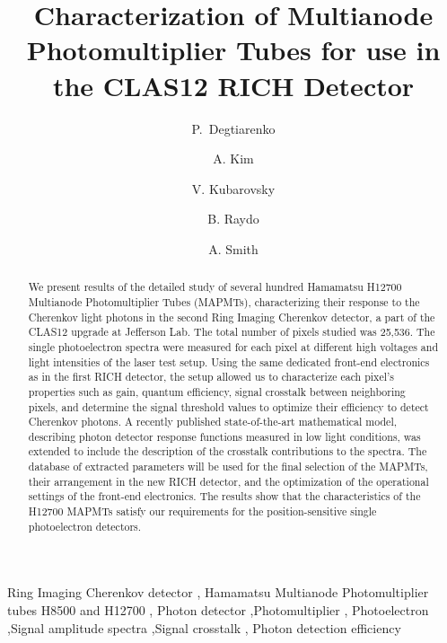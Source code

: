 \documentclass[5p,times,preprint]{elsarticle}
\begin{document}
\begin{frontmatter}
\title{Characterization of Multianode Photomultiplier Tubes for use in the CLAS12 RICH Detector}

\author[A]{P.~Degtiarenko }
\author[B]{A. Kim } 
\author[A]{V. Kubarovsky }
\author[A]{B. Raydo}
\author[C]{A. Smith}



\address[A]{Thomas Je erson National Accelerator Facility, Newport News, VA 23606, USA}
\address[B]{University of Connecticut, Storrs, CT 06269, USA}
\address[C]{Duke University, Durham, NC 27705, USA}



\begin{abstract}
We present results of the detailed study of several hundred Hamamatsu H12700 Multianode Photomultiplier Tubes (MAPMTs), characterizing their response to the Cherenkov light photons in the second Ring Imaging Cherenkov detector, a part of the CLAS12 upgrade at Jefferson Lab.
The total number of pixels studied was 25,536.
The single photoelectron spectra were measured for each pixel at different high voltages and  light intensities of the laser test setup. Using the same dedicated front-end electronics as in the first RICH detector, the setup allowed us to characterize each pixel's properties such as gain, quantum efficiency, signal crosstalk between neighboring pixels,
and determine the signal threshold values to optimize their efficiency to detect Cherenkov photons.
A recently published state-of-the-art mathematical model, describing photon detector response functions measured in low light conditions, was extended to include the description of the crosstalk contributions to the spectra.
The database of extracted parameters will be used for the final selection of the MAPMTs, their arrangement in the new RICH detector, and the optimization of the operational settings of the front-end electronics.
The results show that the characteristics of the H12700 MAPMTs satisfy our requirements for the position-sensitive single photoelectron detectors.
\end{abstract}

\begin{keyword}
Ring Imaging Cherenkov detector \sep
Hamamatsu Multianode Photomultiplier tubes H8500 and H12700 \sep
Photon detector \sep Photomultiplier \sep
Photoelectron \sep  Signal amplitude spectra \sep Signal crosstalk \sep
Photon detection efficiency
\end{keyword}


\end{frontmatter}
\end{document}
